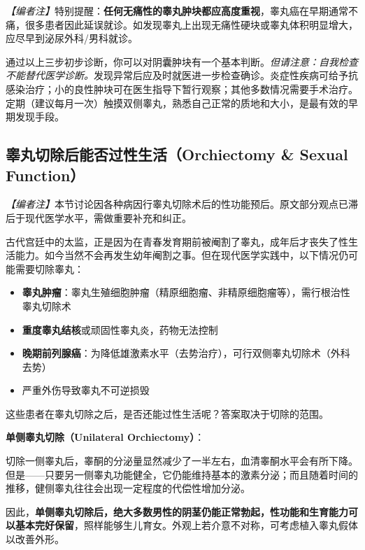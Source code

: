 \documentclass[12pt,a4paper,twoside]{ctexbook}
\begin{document}
\noindent\textit{【编者注】}特别提醒：\textbf{任何无痛性的睾丸肿块都应高度重视}，睾丸癌在早期通常不痛，很多患者因此延误就诊。如发现睾丸上出现无痛性硬块或睾丸体积明显增大，应尽早到泌尿外科/男科就诊。

\begin{tcolorbox}[colback=pink!5!white,colframe=red!50!black,title=贴心小叮咛]
通过以上三步初步诊断，你可以对阴囊肿块有一个基本判断。\textit{但请注意：自我检查不能替代医学诊断。}发现异常后应及时就医进一步检查确诊。炎症性疾病可给予抗感染治疗；小的良性肿块可在医生指导下暂行观察；其他多数情况需要手术治疗。定期（建议每月一次）触摸双侧睾丸，熟悉自己正常的质地和大小，是最有效的早期发现手段。
\end{tcolorbox}

\subsection{睾丸切除后能否过性生活（Orchiectomy \& Sexual Function）}

\noindent\textit{【编者注】}本节讨论因各种病因行睾丸切除术后的性功能预后。原文部分观点已滞后于现代医学水平，需做重要补充和纠正。

\vspace{0.5em}
古代宫廷中的太监，正是因为在青春发育期前被阉割了睾丸，成年后才丧失了性生活能力。如今当然不会再发生幼年阉割之事。但在现代医学实践中，以下情况仍可能需要切除睾丸：
\begin{itemize}
	\item \textbf{睾丸肿瘤}：睾丸生殖细胞肿瘤（精原细胞瘤、非精原细胞瘤等），需行根治性睾丸切除术
	\item \textbf{重度睾丸结核}或顽固性睾丸炎，药物无法控制
	\item \textbf{晚期前列腺癌}：为降低雄激素水平（去势治疗），可行双侧睾丸切除术（外科去势）
	\item 严重外伤导致睾丸不可逆损毁
\end{itemize}
这些患者在睾丸切除之后，是否还能过性生活呢？答案取决于切除的范围。

\vspace{0.5em}
\noindent\textbf{单侧睾丸切除（Unilateral Orchiectomy）}：

切除一侧睾丸后，睾酮的分泌量显然减少了一半左右，血清睾酮水平会有所下降。但是——只要另一侧睾丸功能健全，它仍能维持基本的激素分泌；而且随着时间的推移，健侧睾丸往往会出现一定程度的代偿性增加分泌。

因此，\textbf{单侧睾丸切除后，绝大多数男性的阴茎仍能正常勃起，性功能和生育能力可以基本完好保留}，照样能够生儿育女。外观上若介意不对称，可考虑植入睾丸假体以改善外形。
\end{document}
